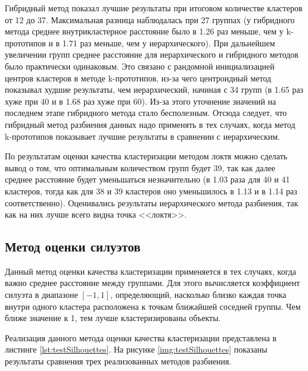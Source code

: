 Гибридный метод показал лучшие результаты при итоговом количестве кластеров от 12 до 37. Максимальная разница наблюдалась при 27 группах (у гибридного метода среднее внутрикластерное расстояние было в 1.26 раз меньше, чем у k-прототипов и в 1.71 раз меньше, чем у иерархического). При дальнейшем увеличении групп среднее расстояние для иерархического и гибридного методов было практически одинаковым. Это связано с рандомной инициализацией центров кластеров в методе k-прототипов, из-за чего центроидный метод показывал худшие результаты, чем иерархический, начиная с 34 групп (в 1.65 раз хуже при 40 и в 1.68 раз хуже при 60). Из-за этого уточнение значений на последнем этапе гибридного метода стало бесполезным. Отсюда следует, что гибридный метод разбиения данных надо применять в тех случаях, когда метод k-прототипов показывает лучшие результаты в сравнении с иерархическим. 

По результатам оценки качества кластеризации методом локтя можно сделать вывод о том, что оптимальным количеством групп будет 39, так как далее среднее расстояние будет уменьшаться незначительно (в 1.03 раза для 40 и 41 кластеров, тогда как для 38 и 39 кластеров оно уменьшилось в 1.13 и в 1.14 раз соответственно). Оценивались результаты иерархического метода разбиения, так как на них лучше всего видна точка <<локтя>>. 

\subsection{Метод оценки силуэтов}

Данный метод оценки качества кластеризации применяется в тех случаях, когда важно среднее расстояние между группами. Для этого вычисляется коэффициент силуэта в диапазоне $[-1, 1]$, определяющий, насколько близко каждая точка внутри одного кластера расположена к точкам ближайшей соседней группы. Чем ближе значение к 1, тем лучше кластеризированы объекты. 

Реализация данного метода оценки качества кластеризации представлена в листинге \ref{lst:testSilhouettes}.
На рисунке \ref{img:testSilhouettes} показаны результаты сравнения трех реализованных методов разбиения.
\clearpage

